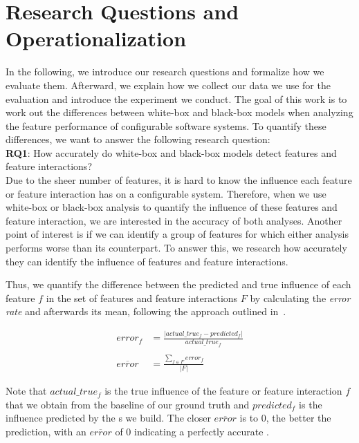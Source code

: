 \section{Research Questions and Operationalization}\label{ch:operationalization}

In the following, we introduce our research questions and formalize how we evaluate them. Afterward,
we explain how we collect our data we use for the evaluation and introduce the experiment we conduct. 
The goal of this work is to work out the differences between white-box and black-box models when analyzing the feature performance of configurable
software systems. 
To quantify these differences, we want to answer the following research question:\\

\noindent \textbf{RQ1}: How accurately do white-box and black-box models detect features and feature interactions? \\

Due to the sheer number of features, it is hard to know the influence each feature or feature interaction has on a configurable system. 
Therefore, when we use white-box or black-box analysis to quantify the influence of these features and feature interaction, 
we are interested in the accuracy of both analyses. 
Another point of interest is if we can identify a group of features for which either analysis performs worse than its counterpart.
To answer this, we research how accurately they can identify the influence of features and feature interactions.

Thus, we quantify the difference between the predicted and true influence of each feature $f$ in the set of features and feature interactions $F$
by calculating the \emph{error rate} and afterwards its mean, following the approach outlined in~\cite{mape}. %


\begin{align}
    error_f &= \frac{\lvert actual\_true_f - predicted_f \rvert}{actual\_true_f} \label{equ:APE_RQ1} \\ \nonumber \\
    \overline{error}  &= \frac{\sum_{f \in F} error_f}{\lvert F \rvert} \label{equ:MAPE_RQ1}
\end{align}

Note that $actual\_true_f$ is the true influence of the feature or feature interaction $f$ that we obtain from the baseline of our ground truth 
and $predicted_f$ is the influence predicted by the {\perfInfluenceModel}s we build.
The closer $\overline{error}$ is to $0$, the better the prediction, with an $\overline{error}$ of 0 indicating a perfectly
accurate \perfInfluenceModel. 

